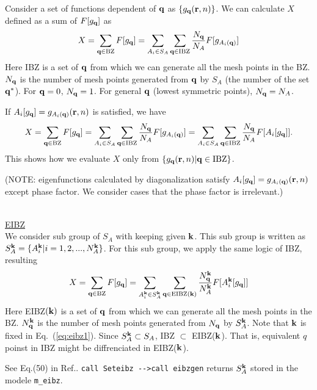 \documentclass[a4paper,10pt,fleqn]{article}
\newcommand{\bfq}{{\bf q}}
\newcommand{\bfk}{{\bf k}}
\newcommand{\bfr}{{\bf r}}
\newcommand{\req}[1]{\mbox{Eq.~(\ref{#1})}}
\begin{document}
Consider a set of functions dependent of $\bfq$ as $\{g_{\bfq}(\bfr, n)\}$.
We can calculate $X$ defined as a sum of $F[g_\bfq]$ as
\begin{eqnarray}
X=\sum_{\bfq\in {\rm BZ}} F[g_\bfq]
= \sum_{A_i \in S_A } 
\sum_{\bfq \in {\rm IBZ}} \frac{N_\bfq}{N_A} F[g_{A_i(\bfq)}] \label{eq:ibz0}
\end{eqnarray}
Here {\rm IBZ} is a set of $\bfq$ from which we can generate all the mesh points in the BZ. 
$N_\bfq$ is the number of mesh points generated from $\bfq$ by $S_A$ (the number of the set $\bfq^*$).
For $\bfq=0$, $N_\bfq=1$. For general $\bfq$ (lowest symmetric points), $N_\bfq=N_A$.

If $A_i[g_\bfq]= g_{A_i(\bfq)}(\bfr,n)$ is satisfied, we have 
\begin{eqnarray}
X=\sum_{\bfq\in {\rm BZ}} F[g_\bfq]
= \sum_{A_i \in S_A } \sum_{\bfq \in {\rm IBZ}} \frac{N_\bfq}{N_A} F[g_{A_i(\bfq)}] 
= \sum_{A_i \in S_A } \sum_{\bfq \in {\rm IBZ}} \frac{N_\bfq}{N_A} F[A_i[g_\bfq]] \label{eq:ibz}.
\end{eqnarray}
This shows how we evaluate $X$ only from $\{g_{\bfq}(\bfr, n)|\bfq \in {\rm IBZ}\}$.
 
\noindent (NOTE: eigenfunctions calculated by diagonalization satisfy
$A_i[g_\bfq]= g_{A_i(\bfq)}(\bfr,n)$ except phase factor. We consider cases that the phase factor is irrelevant.)

\ \\
\noindent \underline{EIBZ}\\
We consider sub group of $S_A$ with keeping given $\bfk$.
This sub group is written as $S^\bfk_A=\{A^\bfk_i |i=1,2,...,N_A^\bfk\}$.
For this sub group, we apply the same logic of IBZ, resulting
\begin{eqnarray}
X=\sum_{\bfq\in {\rm BZ}} F[g_\bfq] = 
\sum_{A^\bfk_i \in S_A^\bfk} \sum_{\bfq \in {\rm EIBZ(\bfk)}}
\frac{N_\bfq^\bfk}{N_A^\bfk} F[A^\bfk_i[g_\bfq]] \label{eq:eibz1}
\end{eqnarray}
Here {\rm EIBZ}$(\bfk)$ is a set of $\bfq$ from which we can generate all the mesh points in the BZ. 
$N^\bfk_\bfq$ is the number of mesh points
generated from $N_\bfq$ by $S^\bfk_A$. Note that $\bfk$ is fixed in \req{eq:eibz1}.
Since $S_A^\bfk \subset S_A$, IBZ $\subset$ EIBZ($\bfk$). That is, equivalent $q$ poinst in IBZ 
might be diffrenciated in EIBZ($\bfk$).

See Eq.(50) in Ref.\cite{friedrich_efficient_2010}.
\verb#call Seteibz -->call eibzgen# returns $S_A^\bfk$ stored in the modele \verb#m_eibz#.
\end{document}
